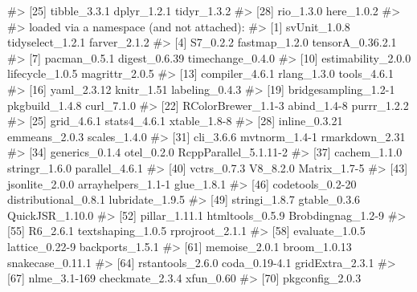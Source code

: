 \documentclass[
  italian,
  letterpaper,
  a4paper,
  11pt,
  open=any]{scrbook}
\newenvironment{Shaded}{\begin{snugshade}}{\end{snugshade}}
\newcommand{\CommentTok}[1]{\textcolor[rgb]{0.37,0.37,0.37}{#1}}
\theoremstyle{plain}
\theoremstyle{definition}
\theoremstyle{definition}
\theoremstyle{remark}
\begin{document}
\begin{tcolorbox}
\begin{Shaded}
\begin{Highlighting}[]
\CommentTok{\#\textgreater{} [25] tibble\_3.3.1          dplyr\_1.2.1           tidyr\_1.3.2          }
\CommentTok{\#\textgreater{} [28] rio\_1.3.0             here\_1.0.2           }
\CommentTok{\#\textgreater{} }
\CommentTok{\#\textgreater{} loaded via a namespace (and not attached):}
\CommentTok{\#\textgreater{}  [1] svUnit\_1.0.8          tidyselect\_1.2.1      farver\_2.1.2         }
\CommentTok{\#\textgreater{}  [4] S7\_0.2.2              fastmap\_1.2.0         tensorA\_0.36.2.1     }
\CommentTok{\#\textgreater{}  [7] pacman\_0.5.1          digest\_0.6.39         timechange\_0.4.0     }
\CommentTok{\#\textgreater{} [10] estimability\_2.0.0    lifecycle\_1.0.5       magrittr\_2.0.5       }
\CommentTok{\#\textgreater{} [13] compiler\_4.6.1        rlang\_1.3.0           tools\_4.6.1          }
\CommentTok{\#\textgreater{} [16] yaml\_2.3.12           knitr\_1.51            labeling\_0.4.3       }
\CommentTok{\#\textgreater{} [19] bridgesampling\_1.2{-}1  pkgbuild\_1.4.8        curl\_7.1.0           }
\CommentTok{\#\textgreater{} [22] RColorBrewer\_1.1{-}3    abind\_1.4{-}8           purrr\_1.2.2          }
\CommentTok{\#\textgreater{} [25] grid\_4.6.1            stats4\_4.6.1          xtable\_1.8{-}8         }
\CommentTok{\#\textgreater{} [28] inline\_0.3.21         emmeans\_2.0.3         scales\_1.4.0         }
\CommentTok{\#\textgreater{} [31] cli\_3.6.6             mvtnorm\_1.4{-}1         rmarkdown\_2.31       }
\CommentTok{\#\textgreater{} [34] generics\_0.1.4        otel\_0.2.0            RcppParallel\_5.1.11{-}2}
\CommentTok{\#\textgreater{} [37] cachem\_1.1.0          stringr\_1.6.0         parallel\_4.6.1       }
\CommentTok{\#\textgreater{} [40] vctrs\_0.7.3           V8\_8.2.0              Matrix\_1.7{-}5         }
\CommentTok{\#\textgreater{} [43] jsonlite\_2.0.0        arrayhelpers\_1.1{-}1    glue\_1.8.1           }
\CommentTok{\#\textgreater{} [46] codetools\_0.2{-}20      distributional\_0.8.1  lubridate\_1.9.5      }
\CommentTok{\#\textgreater{} [49] stringi\_1.8.7         gtable\_0.3.6          QuickJSR\_1.10.0      }
\CommentTok{\#\textgreater{} [52] pillar\_1.11.1         htmltools\_0.5.9       Brobdingnag\_1.2{-}9    }
\CommentTok{\#\textgreater{} [55] R6\_2.6.1              textshaping\_1.0.5     rprojroot\_2.1.1      }
\CommentTok{\#\textgreater{} [58] evaluate\_1.0.5        lattice\_0.22{-}9        backports\_1.5.1      }
\CommentTok{\#\textgreater{} [61] memoise\_2.0.1         broom\_1.0.13          snakecase\_0.11.1     }
\CommentTok{\#\textgreater{} [64] rstantools\_2.6.0      coda\_0.19{-}4.1         gridExtra\_2.3.1      }
\CommentTok{\#\textgreater{} [67] nlme\_3.1{-}169          checkmate\_2.3.4       xfun\_0.60            }
\CommentTok{\#\textgreater{} [70] pkgconfig\_2.0.3}
\end{Highlighting}
\end{Shaded}

\end{tcolorbox}
\end{document}
